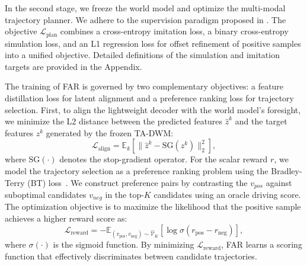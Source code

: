In the second stage, we freeze the world model and optimize the multi-modal trajectory planner. We adhere to the supervision paradigm proposed in \cite{li2025wote}. The objective $\mathcal{L}_{\text{plan}}$ combines a cross-entropy imitation loss, a binary cross-entropy simulation loss, and an L1 regression loss for offset refinement of positive samples into a unified objective. Detailed definitions of the simulation and imitation targets are provided in the Appendix.

The training of FAR is governed by two complementary objectives: a feature distillation loss for latent alignment and a preference ranking loss for trajectory selection. First, to align the lightweight decoder with the world model's foresight, we minimize the L2 distance between the predicted features $\hat{z}^k$ and the target features $z^k$ generated by the frozen TA-DWM:
\begin{equation}
    \mathcal{L}_{\text{align}} = \mathbb{E}_{k} \left[ \| \hat{z}^k - \text{SG}(z^k) \|^2_2 \right],
\end{equation}
where $\text{SG}(\cdot)$ denotes the stop-gradient operator. For the scalar reward $r$, we model the trajectory selection as a preference ranking problem using the Bradley-Terry (BT) loss~\cite{btloss}. We construct preference pairs by contrasting the $v_{pos}$ against suboptimal candidates $v_{neg}$ in the top-$K$ candidates using an oracle driving score. The optimization objective is to maximize the likelihood that the positive sample achieves a higher reward score as:
\begin{equation}
    \mathcal{L}_{\text{reward}} = - \mathbb{E}_{(v_{\text{pos}}, v_{\text{neg}})\sim\hat{\mathcal{V}}_K } \left[ \log \sigma \left( r_{\text{pos}} - r_{\text{neg}} \right) \right],
\end{equation}  
where $\sigma(\cdot)$ is the sigmoid function. By minimizing $\mathcal{L}_{\text{reward}}$, FAR learns a scoring function that effectively discriminates between candidate trajectories.




